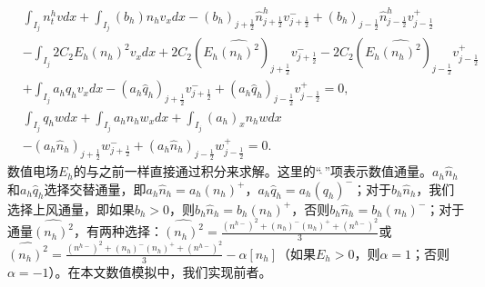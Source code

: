 \begin{align}
     & \int_{I_{j}} n_{t}^{h} v d x+\int_{I_{j}}\left(b_h\right) n_h v_{x} d x                                                                    -\left(b_h\right)_{j+\frac{1}{2}} \hat{n}_{j+\frac{1}{2}}^{h} v_{j+\frac{1}{2}}^{-}  +\left(b_h\right)_{j-\frac{1}{2}} \hat{n}_{j-\frac{1}{2}}^{h} v_{j-\frac{1}{2}}^{+}                                                                                                                                   \nonumber \\
     & -\int_{I_{j}} 2 C_{2} E_h\left(n_h\right)^{2} v_{x} d x+2 C_{2}\left(E_h \widehat{\left(n_h\right)^{2}}\right)_{j+\frac{1}{2}} v_{j+\frac{1}{2}}^{-}-2 C_{2}\left(E_h \widehat{\left(n_h\right)^{2}}\right)_{j-\frac{1}{2}} v_{j-\frac{1}{2}}^{+} \nonumber                                                                                                                                                                                                     \\
     & +\int_{I_{j}} a_h q_h v_{x} d x -\left(a_h \hat{q}_{h}\right)_{j+\frac{1}{2}} v_{j+\frac{1}{2}}^{-}+\left(a_h \hat{q}_{h}\right)_{j-\frac{1}{2}} v_{j-\frac{1}{2}}^{+}=0,             \label{eq:HFRewrittenLDGa}                                                                                                                                                                                                                                                \\
     & \int_{I_{j}} q_h w d x+\int_{I_{j}} a_h n_h w_{x} d x+\int_{I_{j}}\left(a_h\right)_{x} n_h w d x                        \nonumber                                                                                                                                                                                                                                                                                                                               \\
     & -\left(a_h \hat{n}_{h}\right)_{j+\frac{1}{2}} w_{j+\frac{1}{2}}^{-}+\left(a_h \hat{n}_{h}\right)_{j-\frac{1}{2}} w_{j-\frac{1}{2}}^{+}=0 .\label{eq:HFRewrittenLDGb}
\end{align}
数值电场$E_h$的与之前一样直接通过积分来求解。这里的“$\widehat{\ }$”项表示数值通量。$a_h \hat{n}_{h}$和$a_h \hat{q}_{h}$选择交替通量，即$a_h \hat{n}_{h}=a_h\left(n_h\right)^{+}$，$a_h \hat{q}_{h}=a_h\left(q_h\right)^{-}$；对于$b_h \hat{n}_{h}$，我们选择上风通量，即如果$b_h>0$，则$b_h \hat{n}_{h}=b_h\left(n_h\right)^{+}$，否则$b_h \hat{n}_{h}=b_h\left(n_h\right)^{-}$；对于通量$\widehat{\left(n_h\right)^{2}}$，有两种选择：$\widehat{\left(n_h\right)^{2}}=\frac{\left(n^{h-}\right)^{2}+\left(n_h\right)^{-}\left(n_h\right)^{+}+\left(n^{h-}\right)^{2}}{3}$或$\widehat{\left(n_h\right)^{2}}=\frac{\left(n^{h-}\right)^{2}+\left(n_h\right)^{-}\left(n_h\right)^{+}+\left(n^{h-}\right)^{2}}{3}-\alpha\left[n_h\right]$（如果$E_h>0$，则$\alpha=1$；否则$\alpha=-1$）。在本文数值模拟中，我们实现前者。
